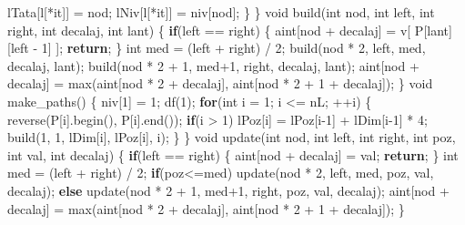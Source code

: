 \documentclass[10pt,]{article}
\newenvironment{Shaded}{}{}
\newcommand{\KeywordTok}[1]{\textcolor[rgb]{0.00,0.44,0.13}{\textbf{{#1}}}}
\newcommand{\DataTypeTok}[1]{\textcolor[rgb]{0.56,0.13,0.00}{{#1}}}
\newcommand{\DecValTok}[1]{\textcolor[rgb]{0.25,0.63,0.44}{{#1}}}
\newcommand{\NormalTok}[1]{{#1}}
\begin{document}
\begin{Shaded}
\begin{Highlighting}[]
    \NormalTok{lTata[l[*it]] = nod;}
    \NormalTok{lNiv[l[*it]] = niv[nod];}
  \NormalTok{\}}
\NormalTok{\}}
\DataTypeTok{void} \NormalTok{build(}\DataTypeTok{int} \NormalTok{nod, }\DataTypeTok{int} \NormalTok{left, }\DataTypeTok{int} \NormalTok{right, }\DataTypeTok{int} \NormalTok{decalaj, }\DataTypeTok{int} \NormalTok{lant) \{}
  \KeywordTok{if}\NormalTok{(left == right) \{}
    \NormalTok{aint[nod + decalaj] = v[ P[lant][left - }\DecValTok{1}\NormalTok{] ];}
    \KeywordTok{return}\NormalTok{;}
  \NormalTok{\}}
  \DataTypeTok{int} \NormalTok{med = (left + right) / }\DecValTok{2}\NormalTok{;}
  \NormalTok{build(nod * }\DecValTok{2}\NormalTok{, left, med, decalaj, lant);}
  \NormalTok{build(nod * }\DecValTok{2} \NormalTok{+ }\DecValTok{1}\NormalTok{, med}\DecValTok{+1}\NormalTok{, right, decalaj, lant);}
  \NormalTok{aint[nod + decalaj] = max(aint[nod * }\DecValTok{2} \NormalTok{+ decalaj], aint[nod * }\DecValTok{2} \NormalTok{+ }\DecValTok{1} \NormalTok{+ decalaj]);}
\NormalTok{\}}
\DataTypeTok{void} \NormalTok{make_paths() \{}
  \NormalTok{niv[}\DecValTok{1}\NormalTok{] = }\DecValTok{1}\NormalTok{;}
  \NormalTok{df(}\DecValTok{1}\NormalTok{);}
  \KeywordTok{for}\NormalTok{(}\DataTypeTok{int} \NormalTok{i = }\DecValTok{1}\NormalTok{; i <= nL; ++i) \{}
    \NormalTok{reverse(P[i].begin(), P[i].end());}
    \KeywordTok{if}\NormalTok{(i > }\DecValTok{1}\NormalTok{)}
      \NormalTok{lPoz[i] = lPoz[i}\DecValTok{-1}\NormalTok{] + lDim[i}\DecValTok{-1}\NormalTok{] * }\DecValTok{4}\NormalTok{;}
    \NormalTok{build(}\DecValTok{1}\NormalTok{, }\DecValTok{1}\NormalTok{, lDim[i], lPoz[i], i);}
  \NormalTok{\}}
\NormalTok{\}}
\DataTypeTok{void} \NormalTok{update(}\DataTypeTok{int} \NormalTok{nod, }\DataTypeTok{int} \NormalTok{left, }\DataTypeTok{int} \NormalTok{right, }\DataTypeTok{int} \NormalTok{poz, }\DataTypeTok{int} \NormalTok{val, }\DataTypeTok{int} \NormalTok{decalaj) \{}
  \KeywordTok{if}\NormalTok{(left == right) \{}
    \NormalTok{aint[nod + decalaj] = val;}
    \KeywordTok{return}\NormalTok{;}
  \NormalTok{\}}
  \DataTypeTok{int} \NormalTok{med = (left + right) / }\DecValTok{2}\NormalTok{;}
  \KeywordTok{if}\NormalTok{(poz<=med)}
    \NormalTok{update(nod * }\DecValTok{2}\NormalTok{, left, med, poz, val, decalaj);}
  \KeywordTok{else}
    \NormalTok{update(nod * }\DecValTok{2} \NormalTok{+ }\DecValTok{1}\NormalTok{, med}\DecValTok{+1}\NormalTok{, right, poz, val, decalaj);}
  \NormalTok{aint[nod + decalaj] = max(aint[nod * }\DecValTok{2} \NormalTok{+ decalaj], aint[nod * }\DecValTok{2} \NormalTok{+ }\DecValTok{1} \NormalTok{+ decalaj]);}
\NormalTok{\}}

\end{Highlighting}
\end{Shaded}
\end{document}
